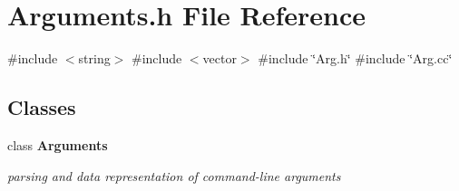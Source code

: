 \section{Arguments.\+h File Reference}
\label{Arguments_8h}
{\ttfamily \#include $<$string$>$}\newline
{\ttfamily \#include $<$vector$>$}\newline
{\ttfamily \#include \char`\"{}Arg.\+h\char`\"{}}\newline
{\ttfamily \#include \char`\"{}Arg.\+cc\char`\"{}}\newline
\subsection*{Classes}
\begin{DoxyCompactItemize}
\item 
class \textbf{ Arguments}
\begin{DoxyCompactList}\small\item\em parsing and data representation of command-\/line arguments \end{DoxyCompactList}\end{DoxyCompactItemize}

